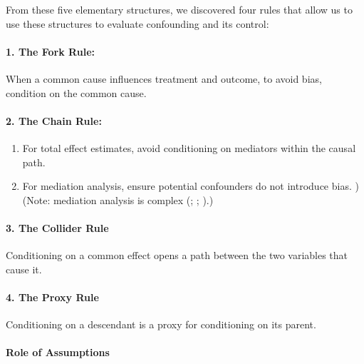 \documentclass[
  singlecolumn]{article}
\let\oldparagraph\paragraph
\renewcommand{\paragraph}[1]{\oldparagraph{#1}\mbox{}}
\providecommand{\tightlist}{%
  \setlength{\itemsep}{0pt}\setlength{\parskip}{0pt}}\usepackage{longtable,booktabs,array}
\begin{document}
From these five elementary structures, we discovered four rules that
allow us to use these structures to evaluate confounding and its
control:

\paragraph{\texorpdfstring{1. \textbf{The Fork
Rule:}}{1. The Fork Rule:}}\label{the-fork-rule}

When a common cause influences treatment and outcome, to avoid bias,
condition on the common cause.

\paragraph{\texorpdfstring{2. \textbf{The Chain
Rule:}}{2. The Chain Rule:}}\label{the-chain-rule}

\begin{enumerate}
\def\labelenumi{(\roman{enumi})}
\tightlist
\item
  For total effect estimates, avoid conditioning on mediators within the
  causal path.
\item
  For mediation analysis, ensure potential confounders do not introduce
  bias. )(Note: mediation analysis is complex
  (;
  ;
  ).)
\end{enumerate}

\paragraph{\texorpdfstring{3. \textbf{The Collider
Rule}}{3. The Collider Rule}}\label{the-collider-rule}

Conditioning on a common effect opens a path between the two variables
that cause it.

\paragraph{\texorpdfstring{4. \textbf{The Proxy
Rule}}{4. The Proxy Rule}}\label{the-proxy-rule}

Conditioning on a descendant is a proxy for conditioning on its parent.

\paragraph{Role of Assumptions}\label{role-of-assumptions}
\end{document}

